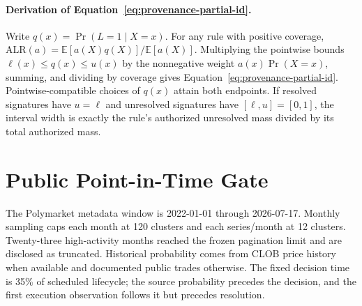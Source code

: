 \paragraph{Derivation of Equation~\eqref{eq:provenance-partial-id}.}
Write $q(x)=\Pr(L=1\mid X=x)$. For any rule with positive coverage,
$\mathrm{ALR}(a)=\mathbb{E}[a(X)q(X)]/\mathbb{E}[a(X)]$.
Multiplying the pointwise bounds $\ell(x)\le q(x)\le u(x)$ by the
nonnegative weight $a(x)\Pr(X=x)$, summing, and dividing by coverage gives
Equation~\eqref{eq:provenance-partial-id}. Pointwise-compatible choices of
$q(x)$ attain both endpoints. If resolved signatures have $u=\ell$ and
unresolved signatures have $[\ell,u]=[0,1]$, the interval width is exactly
the rule's authorized unresolved mass divided by its total authorized mass.

\begin{table}[h]
  \caption{\textbf{Legal observability controls the minimum empirical laundering-classification error.} Joint separation is the weighted empirical separation term in Equation~\eqref{eq:provenance-bayes-risk}; the implementation verifies the corresponding overlap identity to numerical precision.}
  \label{tab:provenance_identifiability}
  \centering
  \benchmarktableformat
  
\end{table}

\section{Public Point-in-Time Gate}
The Polymarket metadata window is 2022-01-01 through 2026-07-17. Monthly sampling caps each month at 120 clusters and each series/month at 12 clusters. Twenty-three high-activity months reached the frozen pagination limit and are disclosed as truncated. Historical probability comes from CLOB price history when available and documented public trades otherwise. The fixed decision time is 35\% of scheduled lifecycle; the source probability precedes the decision, and the first execution observation follows it but precedes resolution.

\begin{table}[h]
  \caption{Public-source classifications and the pre-result power gate. The point-in-time layer remains \texttt{exploratory\_only} because power is below the frozen requirement; no public test outcome is reported.}
  \label{tab:public_power}
  \centering
  \benchmarktableformat
  
\end{table}

